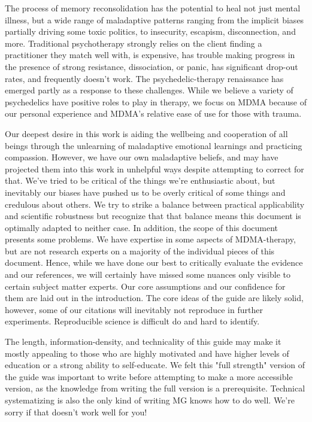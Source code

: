 \documentclass[12pt,letterpaper]{book}
\begin{document}
The process of memory reconsolidation has the potential to heal not just mental illness, but a wide range of maladaptive patterns ranging from the implicit biases partially driving some toxic politics, to insecurity, escapism, disconnection, and more. Traditional psychotherapy strongly relies on the client finding a practitioner they match well with, is expensive, has trouble making progress in the presence of strong resistance, dissociation, or panic, has significant drop-out rates, and frequently doesn't work. The psychedelic-therapy renaissance has emerged partly as a response to these challenges. While we believe a variety of psychedelics have positive roles to play in therapy, we focus on MDMA because of our personal experience and MDMA's relative ease of use for those with trauma.

Our deepest desire in this work is aiding the wellbeing and cooperation of all beings through the unlearning of maladaptive emotional learnings and practicing compassion. However, we have our own maladaptive beliefs, and may have projected them into this work in unhelpful ways despite attempting to correct for that. We've tried to be critical of the things we're enthusiastic about, but inevitably our biases have pushed us to be overly critical of some things and credulous about others. We try to strike a balance between practical applicability and scientific robustness but recognize that that balance means this document is optimally adapted to neither case. In addition, the scope of this document presents some problems. We have expertise in some aspects of MDMA-therapy, but are not research experts on a majority of the individual pieces of this document. Hence, while we have done our best to critically evaluate the evidence and our references, we will certainly have missed some nuances only visible to certain subject matter experts. Our core assumptions and our confidence for them are laid out in the introduction. The core ideas of the guide are likely solid, however, some of our citations will inevitably not reproduce in further experiments. Reproducible science is difficult do and hard to identify.

The length, information-density, and technicality of this guide may make it mostly appealing to those who are highly motivated and have higher levels of education or a strong ability to self-educate. We felt this "full strength" version of the guide was important to write before attempting to make a more accessible version, as the knowledge from writing the full version is a prerequisite. Technical systematizing is also the only kind of writing MG knows how to do well. We're sorry if that doesn't work well for you!
\end{document}
